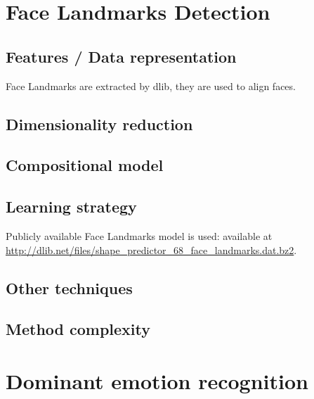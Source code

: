 \documentclass{article}
\begin{document}
\section{Face Landmarks Detection}
\subsection{Features / Data representation}

Face Landmarks are extracted by dlib, they are used to align faces.

\subsection{Dimensionality reduction}

\subsection{Compositional model}

\subsection{Learning strategy}

Publicly available Face Landmarks model is used: available at \url{http://dlib.net/files/shape_predictor_68_face_landmarks.dat.bz2}.

\subsection{Other techniques}

\subsection{Method complexity}


\section{Dominant emotion recognition}
\end{document}
